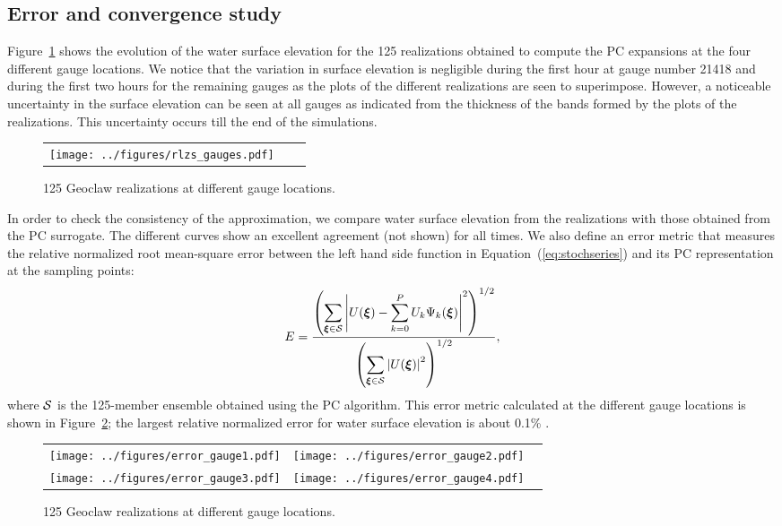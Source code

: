 \subsection{Error and convergence study}
\label{sec:analysis}

Figure~\ref{fig:rlzs} shows the evolution of the
water surface elevation for the 125 realizations obtained 
to compute the PC expansions at the four different gauge 
locations. We notice that the variation in surface elevation 
is negligible during the first hour at gauge number 21418 
and during the first two hours for the remaining gauges
as the plots of the different realizations are seen to superimpose.
However, a noticeable uncertainty in the surface 
elevation can be seen  at all gauges as indicated from the thickness 
of the bands formed by the plots of the realizations. This uncertainty
occurs till the end of the simulations.
\begin{figure}[h]
\centering
\begin{tabular}{clc}        
\texttt{[image: ../figures/rlzs\_gauges.pdf]} 
\end{tabular}
\caption{125 Geoclaw realizations at different gauge locations.}
\label{fig:rlzs}
\end{figure}


In order to check the consistency of the approximation, we compare
 water surface elevation from the realizations 
with those obtained from the PC surrogate. The different curves
show an excellent agreement (not shown) for all times. We also define
an error metric that measures the relative normalized root mean-square error between the left hand side function 
in Equation~(\ref{eq:stochseries})
and its PC representation at the sampling points:
\begin{equation} 
   E = \frac{\displaystyle
         \left(\sum_{\xxi \in \NISP} \left|U(\xxi) - \sum_{k = 0}^{P}
U_k\Psi_k(\xxi)\right|^2
         \right)^{1/2}}
        {\displaystyle
          \left(\sum_{\xxi \in \NISP} \left|U(\xxi)\right|^2\right)^{1/2} 
          },
\label{eq:error}
\end{equation}
where $\mathcal{S}$ is the 125-member ensemble obtained using the PC algorithm. 
This error metric calculated at the different gauge locations is shown in Figure~\ref{fig:error};
the largest relative normalized error for 
water surface elevation is about 0.1\% . 
\begin{figure}[h]
\centering
\begin{tabular}{clc}        
\texttt{[image: ../figures/error\_gauge1.pdf]} &
\texttt{[image: ../figures/error\_gauge2.pdf]} \\
\texttt{[image: ../figures/error\_gauge3.pdf]} &
\texttt{[image: ../figures/error\_gauge4.pdf]} 

\end{tabular}
\caption{125 Geoclaw realizations at different gauge locations.}
\label{fig:error}
\end{figure}

